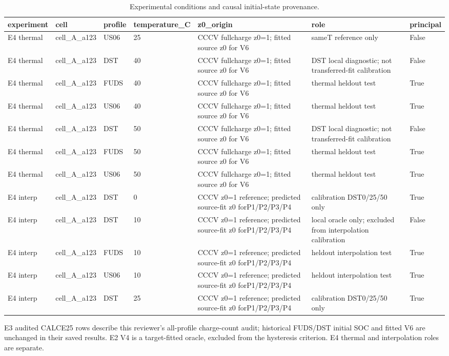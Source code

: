 \begin{table}[!t]
\centering
\footnotesize
\caption{Experimental conditions and causal initial-state provenance.}
\label{tab:reviewer-conditions-6}
\setlength{\tabcolsep}{3pt}
\begin{tabular}{llll p{} p{} l}
\toprule
experiment & cell & profile & temperature\_C & z0\_origin & role & principal \\
\midrule
E4 thermal & cell\_A\_a123 & US06 & 25 & CCCV fullcharge z0=1; fitted source z0 for V6 & sameT reference only & False \\
E4 thermal & cell\_A\_a123 & DST & 40 & CCCV fullcharge z0=1; fitted source z0 for V6 & DST local diagnostic; not transferred-fit calibration & False \\
E4 thermal & cell\_A\_a123 & FUDS & 40 & CCCV fullcharge z0=1; fitted source z0 for V6 & thermal heldout test & True \\
E4 thermal & cell\_A\_a123 & US06 & 40 & CCCV fullcharge z0=1; fitted source z0 for V6 & thermal heldout test & True \\
E4 thermal & cell\_A\_a123 & DST & 50 & CCCV fullcharge z0=1; fitted source z0 for V6 & DST local diagnostic; not transferred-fit calibration & False \\
E4 thermal & cell\_A\_a123 & FUDS & 50 & CCCV fullcharge z0=1; fitted source z0 for V6 & thermal heldout test & True \\
E4 thermal & cell\_A\_a123 & US06 & 50 & CCCV fullcharge z0=1; fitted source z0 for V6 & thermal heldout test & True \\
E4 interp & cell\_A\_a123 & DST & 0 & CCCV z0=1 reference; predicted source-fit z0 forP1/P2/P3/P4 & calibration DST0/25/50 only & True \\
E4 interp & cell\_A\_a123 & DST & 10 & CCCV z0=1 reference; predicted source-fit z0 forP1/P2/P3/P4 & local oracle only; excluded from interpolation calibration & False \\
E4 interp & cell\_A\_a123 & FUDS & 10 & CCCV z0=1 reference; predicted source-fit z0 forP1/P2/P3/P4 & heldout interpolation test & True \\
E4 interp & cell\_A\_a123 & US06 & 10 & CCCV z0=1 reference; predicted source-fit z0 forP1/P2/P3/P4 & heldout interpolation test & True \\
E4 interp & cell\_A\_a123 & DST & 25 & CCCV z0=1 reference; predicted source-fit z0 forP1/P2/P3/P4 & calibration DST0/25/50 only & True \\
\bottomrule
\end{tabular}
\par\smallskip\begin{minipage}{0.98\textwidth}\footnotesize E3 audited CALCE25 rows describe this reviewer's all-profile charge-count audit; historical FUDS/DST initial SOC and fitted V6 are unchanged in their saved results. E2 V4 is a target-fitted oracle, excluded from the hysteresis criterion. E4 thermal and interpolation roles are separate.\end{minipage}
\end{table}

